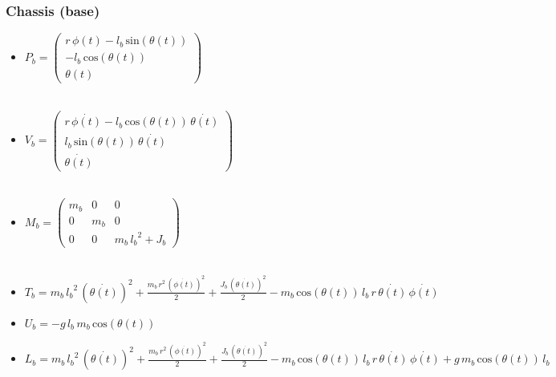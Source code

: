 \subsubsection{Chassis (base)}
\begin{itemize}
	
	\item \textbf{$P_b = \left(\begin{array}{c}
		r\,\phi \left(t\right)-l_b \,\mathrm{sin}\left(\theta \left(t\right)\right)\\
		-l_b \,\mathrm{cos}\left(\theta \left(t\right)\right)\\
		\theta \left(t\right)
		\end{array}\right)$}
	\\\\
	\item \textbf{$V_b = \left(\begin{array}{c}
		r\,\dot{\phi \left(t\right)}-l_b \,\mathrm{cos}\left(\theta \left(t\right)\right)\,\dot{\theta \left(t\right)}\\
		l_b \,\mathrm{sin}\left(\theta \left(t\right)\right)\,\dot{\theta \left(t\right)}\\
		\dot{\theta \left(t\right)}
		\end{array}\right)$}
	\\\\
	\item \textbf{$M_b = \left(\begin{array}{ccc}
		m_b  & 0 & 0\\
		0 & m_b  & 0\\
		0 & 0 & m_b \,{l_b }^2 +J_b 
		\end{array}\right)$}
	\\\\
	\item \textbf{$T_b = m_b \,{l_b }^2 \,{{\left(\dot{\theta \left(t\right)}\right)}}^2 +\frac{m_b \,r^2 \,{{\left(\dot{\phi \left(t\right)}\right)}}^2 }{2}+\frac{J_b \,{{\left(\dot{\theta \left(t\right)}\right)}}^2 }{2}-m_b \,\mathrm{cos}\left(\theta \left(t\right)\right)\,l_b \,r\,\dot{\theta \left(t\right)}\,\dot{\phi \left(t\right)}$}
	\\
	\item \textbf{$U_b = -g\,l_b \,m_b \,\mathrm{cos}\left(\theta \left(t\right)\right)$}
	\\
	\item \textbf{$L_b = m_b \,{l_b }^2 \,{{\left(\dot{\theta \left(t\right)}\right)}}^2 +\frac{m_b \,r^2 \,{{\left(\dot{\phi \left(t\right)}\right)}}^2 }{2}+\frac{J_b \,{{\left(\dot{\theta \left(t\right)}\right)}}^2 }{2}-m_b \,\mathrm{cos}\left(\theta \left(t\right)\right)\,l_b \,r\,\dot{\theta \left(t\right)}\,\dot{\phi \left(t\right)}+g\,m_b \,\mathrm{cos}\left(\theta \left(t\right)\right)\,l_b$}
\end{itemize}
